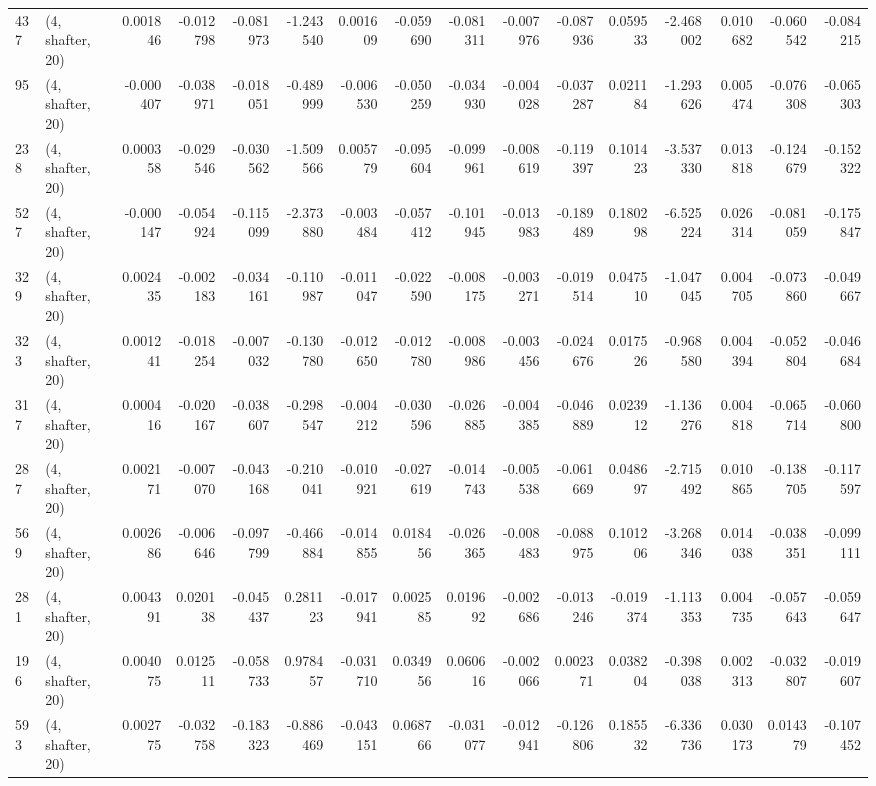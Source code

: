 \begin{tabular}{llrrrrrrrrrrrrrr}
437 &  (4, shafter, 20) &   0.001846 & -0.012798 & -0.081973 &   -1.243540 &  0.001609 &  -0.059690 & -0.081311 & -0.007976 & -0.087936 &  0.059533 &   -2.468002 &  0.010682 & -0.060542 & -0.084215 \\
95  &  (4, shafter, 20) &  -0.000407 & -0.038971 & -0.018051 &   -0.489999 & -0.006530 &  -0.050259 & -0.034930 & -0.004028 & -0.037287 &  0.021184 &   -1.293626 &  0.005474 & -0.076308 & -0.065303 \\
238 &  (4, shafter, 20) &   0.000358 & -0.029546 & -0.030562 &   -1.509566 &  0.005779 &  -0.095604 & -0.099961 & -0.008619 & -0.119397 &  0.101423 &   -3.537330 &  0.013818 & -0.124679 & -0.152322 \\
527 &  (4, shafter, 20) &  -0.000147 & -0.054924 & -0.115099 &   -2.373880 & -0.003484 &  -0.057412 & -0.101945 & -0.013983 & -0.189489 &  0.180298 &   -6.525224 &  0.026314 & -0.081059 & -0.175847 \\
329 &  (4, shafter, 20) &   0.002435 & -0.002183 & -0.034161 &   -0.110987 & -0.011047 &  -0.022590 & -0.008175 & -0.003271 & -0.019514 &  0.047510 &   -1.047045 &  0.004705 & -0.073860 & -0.049667 \\
323 &  (4, shafter, 20) &   0.001241 & -0.018254 & -0.007032 &   -0.130780 & -0.012650 &  -0.012780 & -0.008986 & -0.003456 & -0.024676 &  0.017526 &   -0.968580 &  0.004394 & -0.052804 & -0.046684 \\
317 &  (4, shafter, 20) &   0.000416 & -0.020167 & -0.038607 &   -0.298547 & -0.004212 &  -0.030596 & -0.026885 & -0.004385 & -0.046889 &  0.023912 &   -1.136276 &  0.004818 & -0.065714 & -0.060800 \\
287 &  (4, shafter, 20) &   0.002171 & -0.007070 & -0.043168 &   -0.210041 & -0.010921 &  -0.027619 & -0.014743 & -0.005538 & -0.061669 &  0.048697 &   -2.715492 &  0.010865 & -0.138705 & -0.117597 \\
569 &  (4, shafter, 20) &   0.002686 & -0.006646 & -0.097799 &   -0.466884 & -0.014855 &   0.018456 & -0.026365 & -0.008483 & -0.088975 &  0.101206 &   -3.268346 &  0.014038 & -0.038351 & -0.099111 \\
281 &  (4, shafter, 20) &   0.004391 &  0.020138 & -0.045437 &    0.281123 & -0.017941 &   0.002585 &  0.019692 & -0.002686 & -0.013246 & -0.019374 &   -1.113353 &  0.004735 & -0.057643 & -0.059647 \\
196 &  (4, shafter, 20) &   0.004075 &  0.012511 & -0.058733 &    0.978457 & -0.031710 &   0.034956 &  0.060616 & -0.002066 &  0.002371 &  0.038204 &   -0.398038 &  0.002313 & -0.032807 & -0.019607 \\
593 &  (4, shafter, 20) &   0.002775 & -0.032758 & -0.183323 &   -0.886469 & -0.043151 &   0.068766 & -0.031077 & -0.012941 & -0.126806 &  0.185532 &   -6.336736 &  0.030173 &  0.014379 & -0.107452 \\
\bottomrule
\end{tabular}
